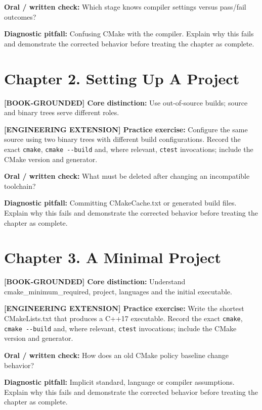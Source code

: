 \documentclass[11pt,letterpaper,oneside]{report}
\providecommand{\passthrough}[1]{#1}
\begin{document}
\textbf{Oral / written check:} Which stage knows compiler settings
versus pass/fail outcomes?

\textbf{Diagnostic pitfall:} Confusing CMake with the compiler. Explain
why this fails and demonstrate the corrected behavior before treating
the chapter as complete.

\section{Chapter 2. Setting Up A
Project}\label{chapter-2.-setting-up-a-project}

\textbf{{[}BOOK-GROUNDED{]} Core distinction:} Use out-of-source builds;
source and binary trees serve different roles.

\textbf{{[}ENGINEERING EXTENSION{]} Practice exercise:} Configure the
same source using two binary trees with different build configurations.
Record the exact \passthrough{\lstinline!cmake!},
\passthrough{\lstinline!cmake --build!} and, where relevant,
\passthrough{\lstinline!ctest!} invocations; include the CMake version
and generator.

\textbf{Oral / written check:} What must be deleted after changing an
incompatible toolchain?

\textbf{Diagnostic pitfall:} Committing CMakeCache.txt or generated
build files. Explain why this fails and demonstrate the corrected
behavior before treating the chapter as complete.

\section{Chapter 3. A Minimal
Project}\label{chapter-3.-a-minimal-project}

\textbf{{[}BOOK-GROUNDED{]} Core distinction:} Understand
cmake\_minimum\_required, project, languages and the initial executable.

\textbf{{[}ENGINEERING EXTENSION{]} Practice exercise:} Write the
shortest CMakeLists.txt that produces a C++17 executable. Record the
exact \passthrough{\lstinline!cmake!},
\passthrough{\lstinline!cmake --build!} and, where relevant,
\passthrough{\lstinline!ctest!} invocations; include the CMake version
and generator.

\textbf{Oral / written check:} How does an old CMake policy baseline
change behavior?

\textbf{Diagnostic pitfall:} Implicit standard, language or compiler
assumptions. Explain why this fails and demonstrate the corrected
behavior before treating the chapter as complete.
\end{document}
